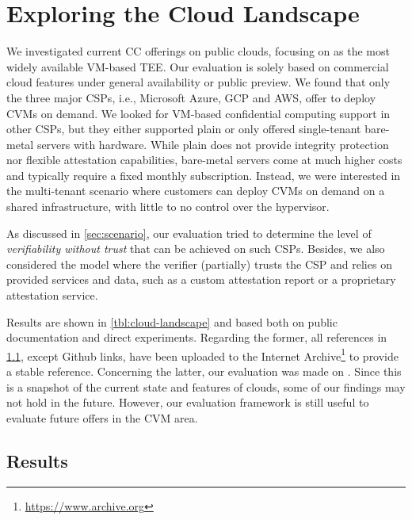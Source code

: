 \section{Exploring the Cloud Landscape}
\label{section:cloud}



We investigated current \ac{CC} offerings on public clouds, focusing on
\sevsnp{} as the most widely available VM-based \ac{TEE}. Our evaluation is
solely based on commercial cloud features under general availability or public
preview. We found that only the three major \acp{CSP}, i.e., Microsoft Azure,
\ac{GCP} and \ac{AWS}, offer to deploy \sevsnp{} \acp{CVM} on demand. We looked
for VM-based confidential computing support in other \acp{CSP}, but they either
supported plain \sev{} or only offered single-tenant bare-metal servers with
\sevsnp{} hardware. While plain \sev{} does not provide integrity protection nor
flexible attestation capabilities, bare-metal servers come at much higher costs
and typically require a fixed monthly subscription. Instead, we were interested
in the multi-tenant scenario where customers can deploy \acp{CVM} on demand on a
shared infrastructure, with little to no control over the hypervisor.

As discussed in \cref{sec:scenario}, our evaluation tried to determine the level
of \emph{verifiability without trust} that can be achieved on such
\acp{CSP}. Besides, we also considered the model where the verifier (partially)
trusts the \ac{CSP} and relies on provided services and data, such as a custom
attestation report or a proprietary attestation service.

Results are shown in \cref{tbl:cloud-landscape} and based both on public
documentation and direct experiments. Regarding the former, all references in
\cref{eval:cloud-results}, except Github links, have been uploaded to the
Internet Archive\footnote{\url{https://www.archive.org}} to provide a stable
reference. Concerning the latter, our evaluation was made on \clouddate{}. Since
this is a snapshot of the current state and features of clouds, some of our
findings may not hold in the future. However, our evaluation framework is still
useful to evaluate future offers in the \ac{CVM} area.

\subsection{Results}
\label{eval:cloud-results}

